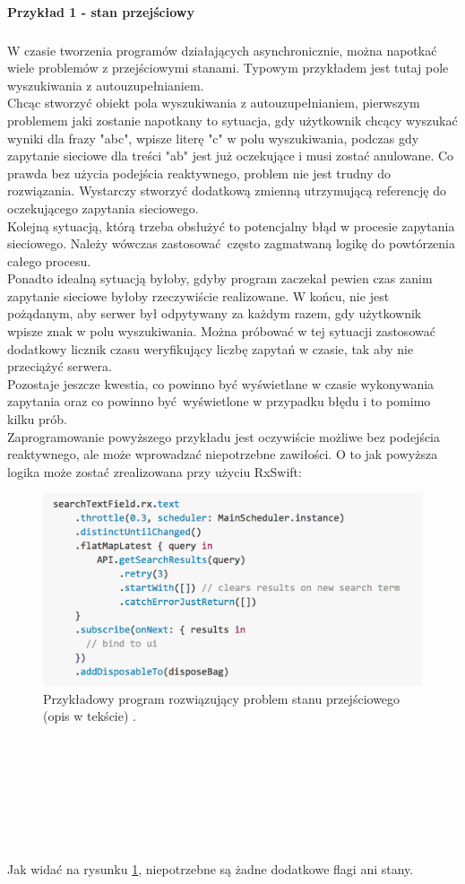 \documentclass[12pt,oneside,a4paper]{report}
\begin{document}
\paragraph{Przykład 1 - stan przejściowy}
\subparagraph{}W czasie tworzenia programów działających asynchronicznie, można napotkać wiele problemów z przejściowymi stanami. Typowym przykładem jest tutaj pole wyszukiwania z autouzupełnianiem.\\
Chcąc stworzyć obiekt pola wyszukiwania z autouzupełnianiem, pierwszym problemem jaki zostanie napotkany to sytuacja, gdy użytkownik chcący wyszukać wyniki dla frazy "abc", wpisze literę "c" w polu wyszukiwania, podczas gdy zapytanie sieciowe dla treści "ab" jest już oczekujące i musi zostać anulowane. Co prawda bez użycia podejścia reaktywnego, problem nie jest trudny do rozwiązania. Wystarczy stworzyć dodatkową zmienną utrzymującą referencję do oczekującego zapytania sieciowego.\\
Kolejną sytuacją, którą trzeba obsłużyć to potencjalny błąd w procesie zapytania sieciowego. Należy wówczas zastosować często zagmatwaną logikę do powtórzenia całego procesu.\\
Ponadto idealną sytuacją byłoby, gdyby program zaczekał pewien czas zanim zapytanie sieciowe byłoby rzeczywiście realizowane. W końcu, nie jest pożądanym, aby serwer był odpytywany za każdym razem, gdy użytkownik wpisze znak w polu wyszukiwania. Można próbować w tej sytuacji zastosować dodatkowy licznik czasu weryfikujący liczbę zapytań w czasie, tak aby nie przeciążyć serwera.\\
Pozostaje jeszcze kwestia, co powinno być wyświetlane w czasie wykonywania zapytania oraz co powinno być wyświetlone w przypadku błędu i to pomimo kilku prób.\\
Zaprogramowanie powyższego przykładu jest oczywiście możliwe bez podejścia reaktywnego, ale może wprowadzać niepotrzebne zawiłości.
O to jak powyższa logika może zostać zrealizowana przy użyciu RxSwift:
\begin{figure}[ht!]
	\centering
	\includegraphics[width=15cm]{transientState}
	\caption{Przykładowy program rozwiązujący problem stanu przejściowego (opis w tekście) \cite{transientState}.}
	\label{transientState}
\end{figure}
\\\\\\\\\\\\\\
Jak widać na rysunku \ref{transientState}, niepotrzebne są żadne dodatkowe flagi ani stany.
\end{document}
